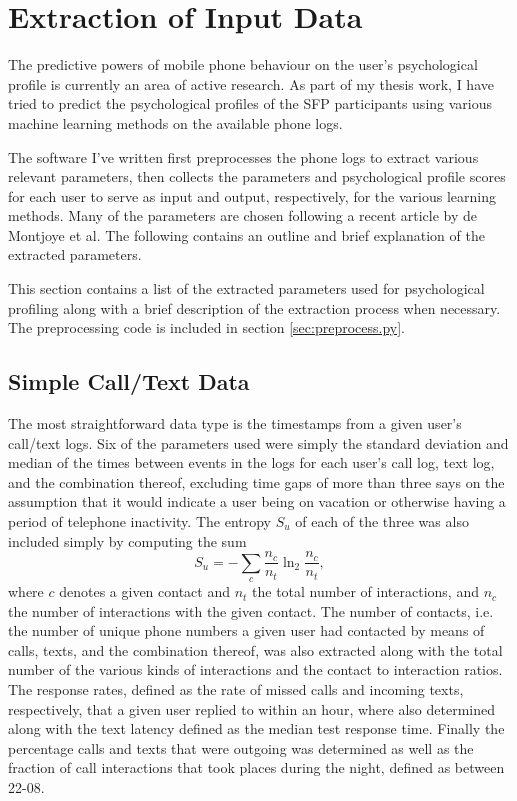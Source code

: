 \section{Extraction of Input Data}
\label{sec:data_extraction}
The predictive powers of mobile phone behaviour on the user's psychological profile is currently an area of  active research. As part of my thesis work, I have tried to predict the psychological profiles of the SFP participants using various machine learning methods on the available phone logs.

The software I've written first preprocesses the phone logs to extract various relevant parameters, then collects the parameters and psychological profile scores for each user to serve as input and output, respectively, for the various learning methods. Many of the parameters are chosen following a recent article by de Montjoye et al\cite{demontjoye2013}. The following contains an outline and brief explanation of the extracted parameters.

This section contains a list of the extracted parameters used for psychological profiling along with a brief description of the extraction process when necessary. The preprocessing code is included in section \ref{sec:preprocess.py}.

\subsection{Simple Call/Text Data}
The most straightforward data type is the timestamps from a given user's call/text logs. Six of the parameters used were simply the standard deviation and median of the times between events in the logs for each user's call log, text log, and the combination thereof, excluding time gaps of more than three says on the assumption that it would indicate a user being on vacation or otherwise having a period of telephone inactivity. The entropy $S_u$ of each of the three was also included simply by computing the sum
\begin{equation}
	S_u = - \sum_c \frac{n_c}{n_t} \ln_2{\frac{n_c}{n_t}}, \label{eqn:contact_entropy}
\end{equation}
where $c$ denotes a given contact and $n_t$ the total number of interactions, and $n_c$ the number of interactions with the given contact. The number of contacts, i.e. the number of unique phone numbers a given user had contacted by means of calls, texts, and the combination thereof, was also extracted along with the total number of the various kinds of interactions and the contact to interaction ratios. The response rates, defined as the rate of missed calls and incoming texts, respectively, that a given user replied to within an hour, where also determined along with the text latency defined as the median test response time. Finally the percentage calls and texts that were outgoing was determined as well as the fraction of call interactions that took places during the night, defined as between 22-08.

